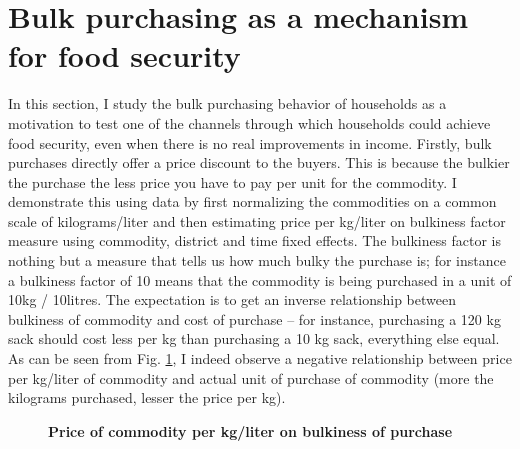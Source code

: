 \documentclass[12pt]{article}
\begin{document}
{\pagebreak
\clearpage


\section{Bulk purchasing as a mechanism for food security}\label{sec:mechanism} 

\hspace{1cm} In this section, I study the bulk purchasing behavior of households as a motivation to test one of the channels through which households could achieve food security, even when there is no real improvements in income. Firstly, bulk purchases directly offer a price discount to the buyers. This is because the bulkier the purchase the less price you have to pay per unit for the commodity. I demonstrate this using data by first normalizing the commodities on a common scale of kilograms/liter and then estimating price per kg/liter  on bulkiness factor measure using commodity, district and time fixed effects. The bulkiness factor is nothing but a measure that tells us how much bulky the purchase is; for instance a bulkiness factor of 10 means that the commodity is being purchased in a unit of 10kg / 10litres. The expectation is to get an inverse relationship between bulkiness of commodity and cost of purchase – for instance, purchasing a 120 kg sack should cost less per kg than purchasing a 10 kg sack, everything else equal. As can be seen from Fig. \ref{fig:fig2}, I indeed observe a negative relationship between price per kg/liter of commodity and actual unit of purchase of commodity (more the kilograms purchased, lesser the price per kg). 

\graphicspath{{Images/}}
\begin{figure}[ht]
\caption{\textbf{Price of commodity per kg/liter on bulkiness of purchase}}
\label{fig:fig2}
\end{figure}

}
\end{document}
